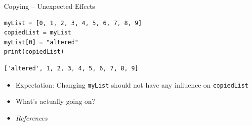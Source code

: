 \begin{frame}[fragile]{Copying -- Unexpected Effects}
%
\begin{tcbraster}[raster columns=2,
                  raster equal height,
                  nobeforeafter,
                  raster column skip=0.5cm]
\begin{warnbox}[Example: working copy (erroneous), leftupper=7mm]
\begin{verbatim}
myList = [0, 1, 2, 3, 4, 5, 6, 7, 8, 9]
copiedList = myList
myList[0] = "altered"
print(copiedList)
\end{verbatim}
\end{warnbox}
%
\begin{cmdbox}
\begin{verbatim}
['altered', 1, 2, 3, 4, 5, 6, 7, 8, 9]
\end{verbatim}
\end{cmdbox}
\end{tcbraster}
%
\begin{itemize}
\item Expectation: Changing \texttt{myList} should not have any influence on \texttt{copiedList}
\item What's actually going on?
\item[\Thus] \emph{References}
\end{itemize}
%
\end{frame}


